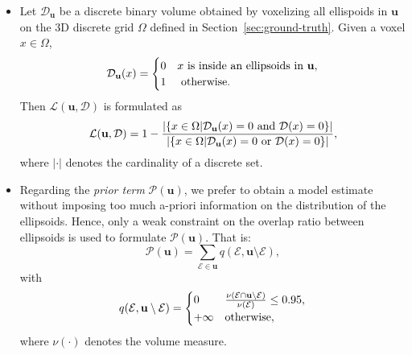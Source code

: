 \documentclass[journal]{IEEEtran}
\begin{document}
\begin{itemize}
\item Let $\mathcal{D}_{\mathbf{u}}$ be a discrete binary volume
  obtained by voxelizing all ellispoids in $\mathbf{u}$ on the 3D
  discrete grid $\Omega$ defined in
  Section~\ref{sec:ground-truth}. Given a voxel $x \in \Omega$,
  \begin{equation}
    \label{eq:configuration-voxel}
    \mathcal{\mathcal{D}_{\mathbf{u}}}(x) =
    \begin{cases}
      0 & x\textnormal{ is inside an ellipsoids in }\mathbf{u}, \\
      1 & \textnormal{ otherwise}. \\
    \end{cases}
  \end{equation}
  Then $\mathcal{L}(\mathbf{u}, \mathcal{D})$ is formulated as
  \begin{equation}
    \label{eq:data-term1-single}
    \mathcal{L}(\mathbf{u}, \mathcal{D}) = 1 - \frac{ |
      \{ x \in \Omega | \mathcal{D}_{\mathbf{u}}(x) = 0 \textnormal{
        and } \mathcal{D}(x) = 0 \} |} {
      |\{ x \in \Omega | \mathcal{D}_{\mathbf{u}}(x) = 0 \textnormal{
        or } \mathcal{D}(x) = 0 \}|},
  \end{equation}
  where $|\cdot|$ denotes the cardinality of a discrete set.

\item Regarding the \textit{prior term} $\mathcal{P} (\mathbf{u})$, we
  prefer to obtain a model estimate without imposing too much a-priori
  information on the distribution of the ellipsoids. Hence, only a
  weak constraint on the overlap ratio between ellipsoids is used to
  formulate $\mathcal{P} (\mathbf{u})$. That is:
  \begin{equation}
    \label{eq:prior-term}
    \mathcal{P} (\mathbf{u}) = \sum_{\mathcal{E} \in \mathbf{u}}
    q(\mathcal{E}, \mathbf{u} \setminus \mathcal{E}),
  \end{equation}
  with
  \begin{equation}
    \label{eq:prior-term-detail}
    q(\mathcal{E}, \mathbf{u} \setminus \mathcal{E}) =
    \begin{cases}
      0 & \frac{\nu(\mathcal{E} \cap \mathbf{u} \setminus
        \mathcal{E})} {\nu(\mathcal{E})}
      \le 0.95, \\
      +\infty & \textnormal{otherwise},
    \end{cases}
  \end{equation}
  where $\nu(\cdot)$ denotes the volume measure.
\end{itemize}
\end{document}
